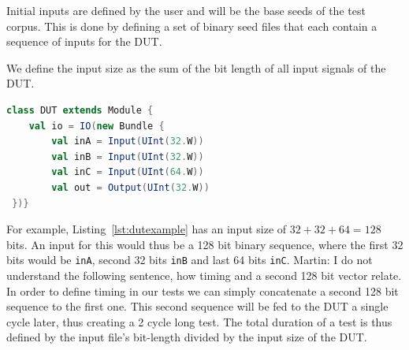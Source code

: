 \documentclass[conference]{IEEEtran}
\newcommand{\martin}[1]{{\color{blue} Martin: #1}}
\begin{document}
Initial inputs are defined by the user and will be the base seeds of the test corpus.
This is done by defining a set of binary seed files that each contain a sequence of inputs for the DUT.

We define the input size as the sum of the bit length of all input signals of the DUT.
\begin{lstlisting}[captionpos=b,caption={Basic DUT with two 32 bit inputs, one 64 input, as well as a 32 bit output.},label={lst:dutexample},language=scala]
class DUT extends Module {
    val io = IO(new Bundle {
        val inA = Input(UInt(32.W))
        val inB = Input(UInt(32.W))
        val inC = Input(UInt(64.W))
        val out = Output(UInt(32.W))
 })}
\end{lstlisting}
For example, Listing~\ref{lst:dutexample} has an input size of $32 + 32 + 64 = 128$ bits.
An input for this would thus be a 128 bit binary sequence, where the first 32 bits would be \texttt{inA}, second 32 bits \texttt{inB} and last 64 bits \texttt{inC}.
\martin{I do not understand the following sentence, how timing and a second 128 bit vector relate.}
In order to define timing in our tests we can simply concatenate a second 128 bit sequence to the first one.
This second sequence will be fed to the DUT a single cycle later, thus creating a 2 cycle long test.
The total duration of a test is thus defined by the input file's bit-length divided by the input size of the DUT.
\end{document}
